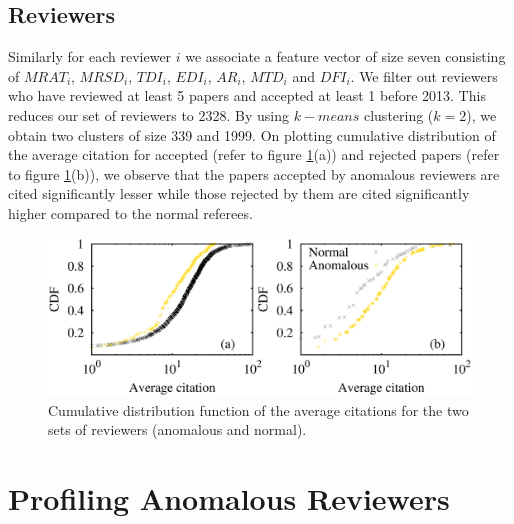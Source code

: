 \subsection{Reviewers}

Similarly for each reviewer $i$ we associate a feature vector of size seven consisting of $MRAT_{i}$, $MRSD_{i}$, $TDI_{i}$, $EDI_{i}$, $AR_{i}$, $MTD_{i}$ and $DFI_{i}$. 
We filter out reviewers who have reviewed at least 5 papers and accepted at least 1 before 2013. This reduces our set of reviewers to 2328. By using $k-means$ clustering ($k=2$), we obtain two clusters of size 339 and 
1999. On plotting cumulative distribution of the average citation for accepted (refer to figure \ref{rev_pred}(a)) and rejected papers (refer to figure \ref{rev_pred}(b)), we observe that the papers accepted by anomalous reviewers are cited significantly lesser while those rejected by them are cited significantly higher compared to the normal referees.

\begin{figure}
\centering
\includegraphics[scale=0.4]{./texfiles/Chapter_4/cikm/figures/reviewer_all_anom.eps}
\caption{\label{rev_pred}Cumulative distribution function of the average citations for the two sets of reviewers (anomalous and normal).}
\end{figure}


%
%

\section{Profiling Anomalous Reviewers}
\label{profile}


